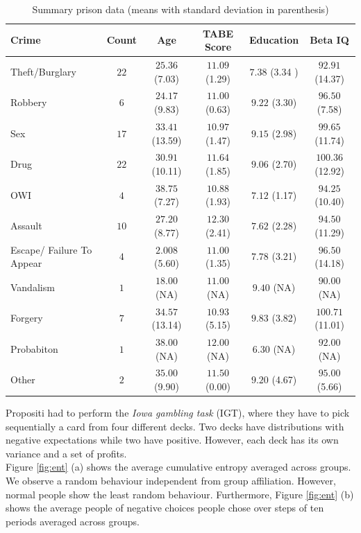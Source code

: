 \documentclass[12pt,a4paper,bibliography=totocnumbered,listof=totocnumbered]{scrartcl}
\begin{document}
\begin{table}[!htbp]
	\scriptsize
	 \centering 
	\begin{tabular}{ l|ccccc} 
		\toprule 
		Crime & \textbf{Count} & \textbf{Age} & \textbf{TABE Score} & \textbf{Education} & \textbf{Beta IQ} \\ 
		\hline
	Theft/Burglary & $22$ & $25.36$  (7.03) & $11.09$ (1.29) & $7.38$ (3.34 )& $92.91$ (14.37) \\ 
	Robbery & $6$ & $24.17$ (9.83) & $11.00$ (0.63) & $9.22$ (3.30) & $96.50$ (7.58) \\          
	Sex & $17$ & $33.41$ (13.59) & $10.97$ (1.47) & $9.15$ (2.98) & $99.65$ (11.74) \\       
	Drug & $22$ & $30.91$ (10.11)  & $11.64$ (1.85)& $9.06$   (2.70)  & $100.36$ (12.92) \\     
	OWI & $4$ & $38.75$ (7.27) & $10.88$ (1.93) & $7.12$ (1.17)& $94.25$ (10.40) \\        
	Assault & $10$ & $27.20$ (8.77) & $12.30$ (2.41)& $7.62$ (2.28) & $94.50$ (11.29) \\       
	Escape/ Failure To Appear & $4$ & $2.008$ (5.60)& $11.00$ (1.35)& $7.78$  (3.21)& $96.50$  (14.18)\\     
	Vandalism & $1$ & $18.00$ (NA)& $11.00$ (NA)& $9.40$ (NA)& $90.00$ (NA)\\ 
	Forgery & $7$ & $34.57$ (13.14)& $10.93$ (5.15) & $9.83$ (3.82)& $100.71$ (11.01)\\       
	Probabiton & $1$ & $38.00$ (NA)& $12.00$ (NA)& $6.30$ (NA)& $92.00$ (NA)\\ 
	Other & $2$ & $35.00$ (9.90)& $11.50$ (0.00)& $9.20$ (4.67)& $95.00$ (5.66)\\       
		\bottomrule 
	\end{tabular} 
		\caption{Summary prison data (means with standard deviation in parenthesis)} 
		\label{tab:tabps} 
\end{table} 

Propositi had to perform the \textit{Iowa gambling task} (IGT), where they have to pick sequentially a card from four different decks. Two decks have distributions with negative expectations while two have positive. However, each deck has its own variance and a set of profits. \\
Figure \ref{fig:ent} (a) shows the average cumulative entropy averaged across groups. We observe a random behaviour independent from group affiliation. However, normal people show the least random behaviour. Furthermore, Figure \ref{fig:ent} (b) shows the average people of negative choices people chose over steps of ten periods averaged across groups.     
\end{document}
